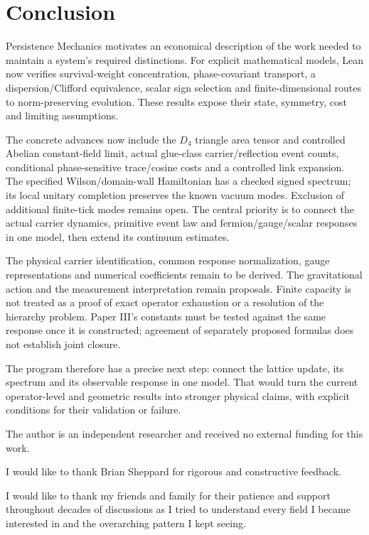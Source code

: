 \section{Conclusion}

Persistence Mechanics motivates an economical description of the work needed to maintain a system's required distinctions. For explicit mathematical models, Lean now verifies survival-weight concentration, phase-covariant transport, a dispersion/Clifford equivalence, scalar sign selection and finite-dimensional routes to norm-preserving evolution. These results expose their state, symmetry, cost and limiting assumptions.

The concrete advances now include the $D_4$ triangle area tensor and controlled Abelian
constant-field limit, actual glue-class carrier/reflection event counts, conditional
phase-sensitive trace/cosine costs and a controlled link expansion. The specified
Wilson/domain-wall Hamiltonian has a checked signed spectrum; its local unitary completion
preserves the known vacuum modes. Exclusion of additional finite-tick modes remains open.
The central priority is to connect the actual carrier dynamics, primitive event law and
fermion/gauge/scalar responses in one model, then extend its continuum estimates.

The physical carrier identification, common response normalization, gauge representations and numerical coefficients remain to be derived. The gravitational action and the measurement interpretation remain proposals. Finite capacity is not treated as a proof of exact operator exhaustion or a resolution of the hierarchy problem. Paper III's constants must be tested against the same response once it is constructed; agreement of separately proposed formulas does not establish joint closure.

The program therefore has a precise next step: connect the lattice update, its spectrum and its observable response in one model. That would turn the current operator-level and geometric results into stronger physical claims, with explicit conditions for their validation or failure.

\begin{acknowledgments}
The author is an independent researcher and received no external funding for this work. 

I would like to thank Brian Sheppard for rigorous and constructive feedback.

I would like to thank my friends and family for their patience and support throughout decades of discussions as I tried to understand every field I became interested in and the overarching pattern I kept seeing.
\end{acknowledgments}